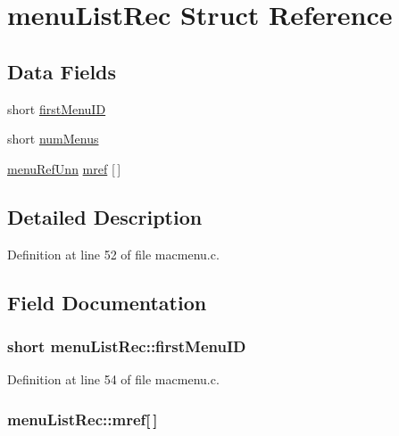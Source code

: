\hypertarget{structmenuListRec}{\section{menu\+List\+Rec Struct Reference}
\label{structmenuListRec}
}
\subsection*{Data Fields}
\begin{DoxyCompactItemize}
\item 
short \hyperlink{structmenuListRec_ace2715562768393587f04253183e10bb}{first\+Menu\+I\+D}
\item 
short \hyperlink{structmenuListRec_a07dadbc47242d6eb5434900010f256f1}{num\+Menus}
\item 
\hyperlink{unionmenuRefUnn}{menu\+Ref\+Unn} \hyperlink{structmenuListRec_a03781c79a800cd280084b7153962fa73}{mref} \mbox{[}$\,$\mbox{]}
\end{DoxyCompactItemize}


\subsection{Detailed Description}


Definition at line 52 of file macmenu.\+c.



\subsection{Field Documentation}
\hypertarget{structmenuListRec_ace2715562768393587f04253183e10bb}{
\subsubsection[{first\+Menu\+I\+D}]{\setlength{\rightskip}{0pt plus 5cm}short menu\+List\+Rec\+::first\+Menu\+I\+D}}\label{structmenuListRec_ace2715562768393587f04253183e10bb}


Definition at line 54 of file macmenu.\+c.

\hypertarget{structmenuListRec_a03781c79a800cd280084b7153962fa73}{
\subsubsection[{mref}]{ menu\+List\+Rec\+::mref\mbox{[}$\,$\mbox{]}}}\label{structmenuListRec_a03781c79a800cd280084b7153962fa73}


